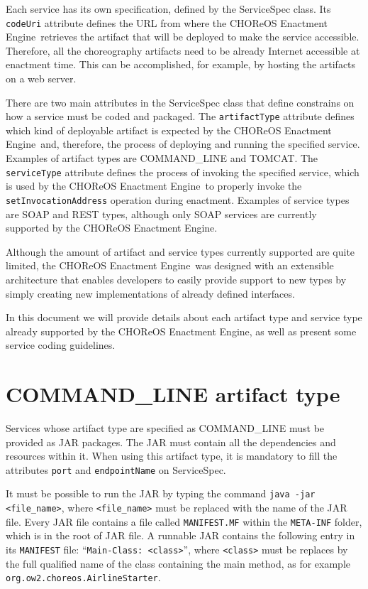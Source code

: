 \documentclass[a4paper, 10pt]{article}
\newcommand{\ee}{CHOReOS Enactment Engine}
\begin{document}
Each service has its own specification, defined by the \textsf{ServiceSpec} class. Its \texttt{codeUri} attribute defines the URL from where the \ee\ retrieves the artifact that will be deployed to make the service accessible. Therefore, all the choreography artifacts need to be already Internet accessible at enactment time. This can be accomplished, for example, by hosting the artifacts on a web server.

There are two main attributes in the \textsf{ServiceSpec} class that define constrains on how a service must be coded and packaged. The \texttt{artifactType} attribute defines which kind of deployable artifact is expected by the \ee\ and, therefore, the process of deploying and running the specified service. Examples of artifact types are COMMAND\_LINE and TOMCAT. The \texttt{serviceType} attribute defines the process of invoking the specified service, which is used by the \ee\ to properly invoke the \texttt{setInvocationAddress} operation during enactment. Examples of service types are SOAP and REST types, although only SOAP services are currently supported by the \ee.

Although the amount of artifact and service types currently supported are quite limited, the \ee\ was designed with an extensible architecture that enables developers to easily provide support to new types by simply creating new implementations of already defined interfaces.

In this document we will provide details about each artifact type and service type already supported by the \ee, as well as present some service coding guidelines. 

\section{COMMAND\_LINE artifact type}

Services whose artifact type are specified as COMMAND\_LINE must be provided as JAR packages. The JAR must contain all the dependencies and resources within it. When using this artifact type, it is mandatory to fill the attributes \texttt{port} and \texttt{endpointName} on \textsf{ServiceSpec}.

It must be possible to run the JAR by typing the command \texttt{java -jar <file\_name>}, where \texttt{<file\_name>} must be replaced with the name of the JAR file. Every JAR file contains a file called \texttt{MANIFEST.MF} within the \texttt{META-INF} folder, which is in the root of JAR file. A runnable JAR contains the following entry in its \texttt{MANIFEST} file: ``\texttt{Main-Class: <class>}'', where \texttt{<class>} must be replaces by the full qualified name of the class containing the main method, as for example \texttt{org.ow2.choreos.AirlineStarter}.
\end{document}

